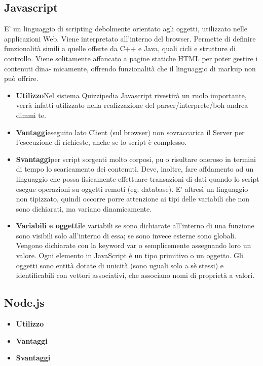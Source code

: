 \documentclass[a4paper,11pt]{article}
\begin{document}
	\subsection{Javascript}
	E' un linguaggio di scripting debolmente orientato agli oggetti, utilizzato nelle applicazioni
Web. Viene interpretato all'interno del browser. Permette di definire funzionalità simili a
quelle offerte da C++ e Java, quali cicli e strutture di controllo.
Viene solitamente affancato a pagine statiche HTML per poter gestire i contenuti dina-
micamente, offrendo funzionalità che il linguaggio di markup non può offrire.
	\begin{itemize}
		\item\textbf{Utilizzo}Nel sistema Quizzipedia Javascript rivestirà un ruolo importante, verrà infatti utilizzato nella realizzazione del parser/interprete/boh andrea dimmi te.
		\item\textbf{Vantaggi}eseguito lato Client (sul browser) non sovraccarica il Server per l'esecuzione di richieste, anche se lo script è complesso.
		\item\textbf{Svantaggi}per script sorgenti molto corposi, puo risultare oneroso in termini di
tempo lo scaricamento dei contenuti. Deve, inoltre, fare affdamento ad un linguaggio
che possa fisicamente effettuare transazioni di dati quando lo script esegue operazioni
su oggetti remoti (eg: database).
E' altresì un linguaggio non tipizzato, quindi occorre porre attenzione ai tipi delle
variabili che non sono dichiarati, ma variano dinamicamente.
		\item\textbf{Variabili e oggetti}le variabili se sono dichiarate all'interno di una funzione sono
visibili solo all'interno di essa; se sono invece esterne sono globali. Vengono dichiarate
con la keyword var o semplicemente assegnando loro un valore.
Ogni elemento in JavaScript è un tipo primitivo o un oggetto.
Gli oggetti sono entità dotate di unicità (sono uguali solo a sè stessi) e identificabili
con vettori associativi, che associano nomi di proprietà a valori.
	\end{itemize}
	\subsection{Node.js}
	\begin{itemize}
		\item\textbf{Utilizzo}
		\item\textbf{Vantaggi}
		\item\textbf{Svantaggi}
	\end{itemize}
\end{document}
